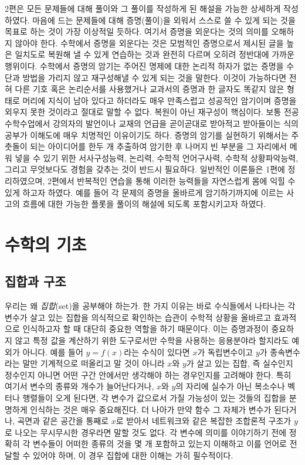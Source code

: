 \documentclass{../../large}
\begin{document}
2편은 모든 문제들에 대해 풀이와 그 풀이를 작성하게 된 해설을 가능한 상세하게 작성하였다.
마음에 드는 문제들에 대해 증명(풀이)을 외워서 스스로 쓸 수 있게 되는 것을 목표로 하는 것이 가장 이상적일 듯하다.
여기서 증명을 외운다는 것의 의미를 오해하지 않아야 한다.
수학에서 증명을 외운다는 것은 모범적인 증명으로서 제시된 글을 높은 일치도로 복원해 낼 수 있게 연습하는 것과 완전히 다르며 오히려 정반대에 가까운 행위이다.
수학에서 증명의 암기는 주어진 명제에 대한 논리적 하자가 없는 증명을 수단과 방법을 가리지 않고 재구성해낼 수 있게 되는 것을 말한다.
이것이 가능하다면 전혀 다른 기호 혹은 논리순서를 사용했거나 교과서의 증명과 한 글자도 똑같지 않은 형태로 머리에 지식이 남아 있다고 하더라도 매우 만족스럽고 성공적인 암기이며 증명을 외우지 못한 것이라고 절대로 말할 수 없다.
복원이 아닌 재구성이 핵심이다.
보통 전공수학수업에서 강의자의 발언이나 교재의 언급을 곧이곧대로 받아적고 받아들이는 식의 공부가 이해도에 매우 치명적인 이유이기도 하다.
증명의 암기를 실현하기 위해서는 주춧돌이 되는 아이디어를 한두 개 추출하여 암기한 후 나머지 빈 부분을 그 자리에서 메워 넣을 수 있기 위한 서사구성능력, 논리력, 수학적 언어구사력, 수학적 상황파악능력, 그리고 무엇보다도 경험을 갖추는 것이 반드시 필요하다.
일반적인 이론들은 1편에 정리하였으며, 2편에서 반복적인 연습을 통해 이러한 능력들을 자연스럽게 몸에 익힐 수 있게 하고자 하였다.
예를 들어 각 문제의 증명을 올바르게 암기하기까지에 이르는 사고의 흐름에 대한 가능한 플롯을 풀이의 해설에 되도록 포함시키고자 하였다.




\tableofcontents



\part{수학의 기초}


\chapter{집합과 구조}

우리는 왜 \emph{집합}(set)을 공부해야 하는가. 
한 가지 이유는 바로 수식들에서 나타나는 각 변수가 살고 있는 집합을 의식적으로 확인하는 습관이 수학적 상황을 올바르고 효과적으로 인식하고자 할 때 대단히 중요한 역할을 하기 때문이다.
이는 증명과정이 중요하지 않고 특정 값을 계산하기 위한 도구로서만 수학을 사용하는 응용분야라 할지라도 예외가 아니다.
예를 들어 $y=f(x)$라는 수식이 있다면 $x$가 독립변수이고 $y$가 종속변수라는 말만 기계적으로 떠올리고 말 것이 아니라 $x$와 $y$가 살고 있는 집합, 즉 실수인지 정수인지 아니면 어떤 구간 안에서만 생각해야 하는 경우인지를 고려해야 한다.
특히 여기서 변수의 종류와 개수가 늘어난다거나, $x$와 $y$의 자리에 실수가 아닌 복소수나 벡터나 행렬들이 오게 된다면, 각 변수가 값으로서 가질 가능성이 있는 것들의 집합을 분명하게 인식하는 것은 매우 중요해진다.
더 나아가 만약 함수 그 자체가 변수가 된다거나, 곡면과 같은 공간을 통째로 $x$로 받아서 네트워크와 같은 복잡한 조합론적 구조가 $y$로 나오는 무시무시한 경우라면 말할 것도 없다.
각 변수에 의미를 이야기하기 전에 정확히 각 변수들이 어떠한 종류의 것을 몇 개 포함하고 있는지 이해하고 이를 언어로 전달할 수 있어야 하며, 이 경우 집합에 대한 이해는 가히 필수적이다.
\end{document}

